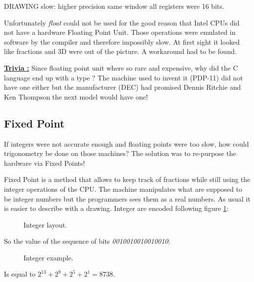 \documentclass[book.tex]{subfiles}
\begin{document}
  \bigskip
  DRAWING
  slow: higher precision
          same window
          all registers were 16 bits.
  \bigskip

  Unfortunately \emph{float} could not be used for the good reason that Intel CPUs did not have a hardware Floating Point Unit. Those operations were emulated in software by the compiler and therefore impossibly slow. At first sight it looked like fractions and 3D were out of the picture. A workaround had to be found.

  \bigskip

 \textbf{\underline{Trivia :}} Since floating point unit where so rare and expensive, why did the C language end up with a  type ? The machine used to invent it (PDP-11) did not have one either but the manufacturer (DEC) had promised Dennis Ritchie and Ken Thompson the next model would have one!














  \subsection{Fixed Point}
  If integers were not accurate enough and floating points were too slow, how could trigonometry be done on those machines? The solution was to re-purpose the hardware via Fixed Points!

   \bigskip

Fixed Point is a method that allows to keep track of fractions while still using the integer operations of the CPU. The machine manipulates what are supposed to be integer numbers but the programmers sees them as a real numbers. As usual it is easier to describe with a drawing. Integer are encoded following figure \ref{fig:int_layout}:
\begin{figure}[H]
\centering
 
 \caption{Integer layout.} \label{fig:int_layout}
 \end{figure}

So the value of the sequence of bits \emph{0010010010010010}:
\begin{figure}[H]
\centering

 \caption{Integer example.} \label{fig:mips}
 \end{figure}

 Is equal to $ 2^{13} + 2^9 + 2^5 + 2^1 =  8738 $.
\end{document}
